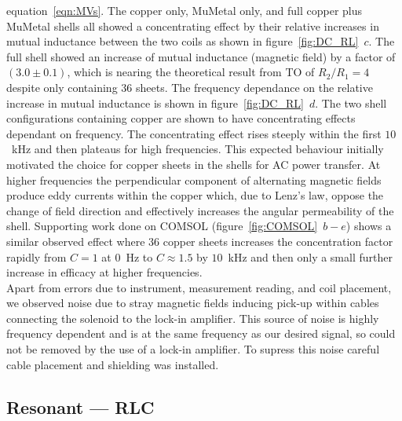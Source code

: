 \documentclass[11pt]{iopart}
\begin{document}
equation~\ref{eqn:MVs}. The copper only, MuMetal only, and full copper
plus MuMetal shells all showed a concentrating effect by their
relative increases in mutual inductance between the two coils as shown
in figure~\ref{fig:DC_RL}~$c$. The full shell showed an increase of
mutual inductance (magnetic field) by a factor of $(3.0\pm0.1)$, which
is nearing the theoretical result from TO of $R_2/R_1 = 4$ despite
only containing $36$ sheets. The frequency dependance on the relative
increase in mutual inductance is shown in
figure~\ref{fig:DC_RL}~$d$. The two shell configurations containing
copper are shown to have concentrating effects dependant on
frequency. The concentrating effect rises steeply within the first
$10$~kHz and then plateaus for high frequencies.  This expected
behaviour initially motivated the choice for copper sheets in the
shells for AC power transfer. At higher frequencies the perpendicular
component of alternating magnetic fields produce eddy currents within
the copper which, due to Lenz's law, oppose the change of field
direction and effectively increases the angular permeability of the
shell.  Supporting work done on COMSOL (figure~\ref{fig:COMSOL}~$b-e$)
shows a similar observed effect where $36$ copper sheets increases the
concentration factor rapidly from $C = 1$ at $0$~Hz to $C \approx 1.5$
by $10$~kHz and then only a small further increase in efficacy at
higher frequencies.\\ Apart from errors due to instrument, measurement
reading, and coil placement, we observed noise due to stray magnetic
fields inducing pick-up within cables connecting the solenoid to the
lock-in amplifier. This source of noise is highly frequency dependent
and is at the same frequency as our desired signal, so could not be
removed by the use of a lock-in amplifier. To supress this noise
careful cable placement and shielding was installed. \\

\subsection*{Resonant --- RLC}
\end{document}
